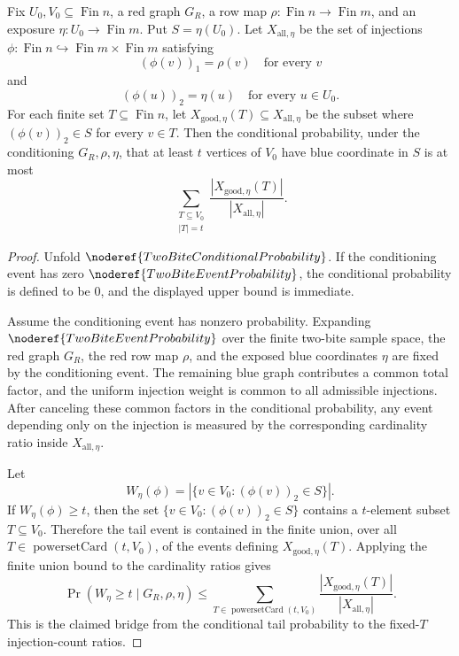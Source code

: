 \begin{helper}
Fix \(U_0,V_0\subseteq\operatorname{Fin}n\), a red graph \(G_R\), a row map
\(\rho:\operatorname{Fin}n\to\operatorname{Fin}m\), and an exposure
\(\eta:U_0\to\operatorname{Fin}m\).  Put \(S=\eta(U_0)\).  Let
\(X_{\mathrm{all},\eta}\) be the set of injections
\(\phi:\operatorname{Fin}n\hookrightarrow
\operatorname{Fin}m\times\operatorname{Fin}m\) satisfying
\[
(\phi(v))_1=\rho(v)\quad\text{for every }v
\]
and
\[
(\phi(u))_2=\eta(u)\quad\text{for every }u\in U_0.
\]
For each finite set \(T\subseteq\operatorname{Fin}n\), let
\(X_{\mathrm{good},\eta}(T)\subseteq X_{\mathrm{all},\eta}\) be the subset
where \((\phi(v))_2\in S\) for every \(v\in T\).  Then the conditional
probability, under the conditioning \(G_R,\rho,\eta\), that at least \(t\)
vertices of \(V_0\) have blue coordinate in \(S\) is at most
\[
\sum_{\substack{T\subseteq V_0\\ |T|=t}}
\frac{|X_{\mathrm{good},\eta}(T)|}{|X_{\mathrm{all},\eta}|}.
\]
\end{helper}
\begin{proof}
Unfold \(\noderef{TwoBiteConditionalProbability}\).  If the conditioning
event has zero \(\noderef{TwoBiteEventProbability}\), the conditional
probability is defined to be \(0\), and the displayed upper bound is
immediate.

Assume the conditioning event has nonzero probability.  Expanding
\(\noderef{TwoBiteEventProbability}\) over the finite two-bite sample space,
the red graph \(G_R\), the red row map \(\rho\), and the exposed blue
coordinates \(\eta\) are fixed by the conditioning event.  The remaining
blue graph contributes a common total factor, and the uniform injection
weight is common to all admissible injections.  After canceling these common
factors in the conditional probability, any event depending only on the
injection is measured by the corresponding cardinality ratio inside
\(X_{\mathrm{all},\eta}\).

Let
\[
W_\eta(\phi)=|\{v\in V_0:(\phi(v))_2\in S\}|.
\]
If \(W_\eta(\phi)\ge t\), then the set
\(\{v\in V_0:(\phi(v))_2\in S\}\) contains a \(t\)-element subset
\(T\subseteq V_0\).  Therefore the tail event is contained in the finite
union, over all \(T\in\operatorname{powersetCard}(t,V_0)\), of the events
defining \(X_{\mathrm{good},\eta}(T)\).  Applying the finite union bound to
the cardinality ratios gives
\[
\Pr(W_\eta\ge t\mid G_R,\rho,\eta)
\le
\sum_{T\in\operatorname{powersetCard}(t,V_0)}
\frac{|X_{\mathrm{good},\eta}(T)|}{|X_{\mathrm{all},\eta}|}.
\]
This is the claimed bridge from the conditional tail probability to the
fixed-\(T\) injection-count ratios.
\end{proof}

